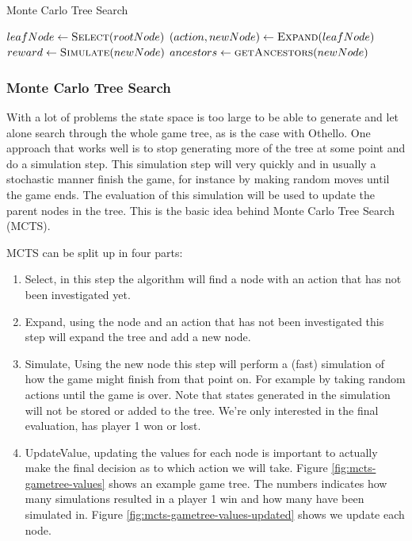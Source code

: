 \documentclass[10pt,letterpaper]{article}
\begin{document}
\begin{algorithm}
\caption{Monte Carlo Tree Search}
\label{algo:mcts}
\begin{algorithmic}
\State $leafNode \gets \Call{Select}{rootNode}$
\State $(action, newNode) \gets \Call{Expand}{leafNode}$
\State $reward \gets \Call{Simulate}{newNode}$
\State $ancestors \gets \Call{getAncestors}{newNode}$
\State \Return {}
\EndWhile
\State \Return {}
\EndFunction
\end{algorithmic}
\end{algorithm}
\subsubsection{Monte Carlo Tree Search}
With a lot of problems the state space is too large to be able to generate and let alone search  through the whole game tree, as is the case with Othello. One approach that works well is to stop generating more of the tree at some point and do a simulation step. This simulation step will very quickly and in usually a stochastic manner finish the game, for instance by making random moves until the game ends. The evaluation of this simulation will be used to update the parent nodes in the tree. This is the basic idea behind Monte Carlo Tree Search (MCTS).

MCTS can be split up in four parts:

\begin{enumerate}
    \item Select, in this step the algorithm will find a node with an action that has not been investigated yet.
    \item Expand, using the node and an action that has not been investigated this step will expand the tree and add a new node.
    \item Simulate, Using the new node this step will perform a (fast) simulation of how the game might finish from that point on. For example by taking random actions until the game is over. Note that states generated in the simulation will not be stored or added to the tree. We're only interested in the final evaluation, has player 1 won or lost.
    \item UpdateValue, updating the values for each node is important to actually make the final decision as to which action we will take. Figure \ref{fig:mcts-gametree-values} shows an example game tree. The numbers indicates how many simulations resulted in a player 1 win and how many have been simulated in. Figure \ref{fig:mcts-gametree-values-updated} shows we update each node. 
\end{enumerate}
\end{document}
